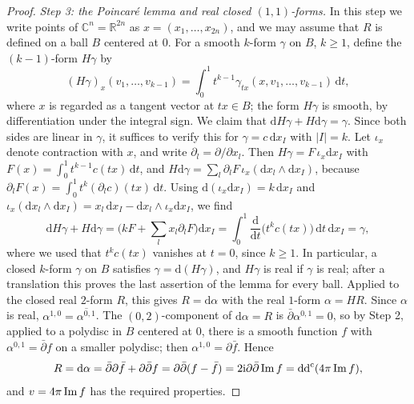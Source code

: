 \begin{proof}
\emph{Step 3: the Poincar\'e lemma and real closed $(1,1)$-forms.} In this step we write points of $\mathbb C^n=\mathbb R^{2n}$ as $x=(x_1,\ldots,x_{2n})$, and we may assume that $R$ is defined on a ball $B$ centered at $0$. For a smooth $k$-form $\gamma$ on $B$, $k\geq1$, define the $(k-1)$-form $H\gamma$ by
\[
 (H\gamma)_x(v_1,\ldots,v_{k-1})
 =\int_0^1t^{k-1}\gamma_{tx}(x,v_1,\ldots,v_{k-1})\,\mathrm{d}t,
\]
where $x$ is regarded as a tangent vector at $tx\in B$; the form $H\gamma$ is smooth, by differentiation under the integral sign. We claim that $\mathrm{d}H\gamma+H\mathrm{d}\gamma=\gamma$. Since both sides are linear in $\gamma$, it suffices to verify this for $\gamma=c\,\mathrm dx_I$ with $|I|=k$. Let $\iota_x$ denote contraction with $x$, and write $\partial_l=\partial/\partial x_l$. Then $H\gamma=F\,\iota_x\mathrm dx_I$ with $F(x)=\int_0^1t^{k-1}c(tx)\,\mathrm dt$, and $H\mathrm d\gamma=\sum_l\partial_lF\,\iota_x(\mathrm dx_l\wedge\mathrm dx_I)$, because $\partial_lF(x)=\int_0^1t^k(\partial_lc)(tx)\,\mathrm dt$. Using $\mathrm d(\iota_x\mathrm dx_I)=k\,\mathrm dx_I$ and $\iota_x(\mathrm dx_l\wedge\mathrm dx_I)=x_l\,\mathrm dx_I-\mathrm dx_l\wedge\iota_x\mathrm dx_I$, we find
\[
 \mathrm dH\gamma+H\mathrm d\gamma=\Big(kF+\sum_lx_l\partial_lF\Big)\mathrm dx_I=\int_0^1\frac{\mathrm d}{\mathrm dt}\big(t^kc(tx)\big)\,\mathrm dt\,\mathrm dx_I=\gamma,
\]
where we used that $t^kc(tx)$ vanishes at $t=0$, since $k\geq1$. In particular, a closed $k$-form $\gamma$ on $B$ satisfies $\gamma=\mathrm d(H\gamma)$, and $H\gamma$ is real if $\gamma$ is real; after a translation this proves the last assertion of the lemma for every ball. Applied to the closed real $2$-form $R$, this gives $R=\mathrm d\alpha$ with the real $1$-form $\alpha=HR$. Since $\alpha$ is real, $\alpha^{1,0}=\overline{\alpha^{0,1}}$. The $(0,2)$-component of $\mathrm d\alpha=R$ is $\bar\partial\alpha^{0,1}=0$, so by Step 2, applied to a polydisc in $B$ centered at $0$, there is a smooth function $f$ with $\alpha^{0,1}=\bar\partial f$ on a smaller polydisc; then $\alpha^{1,0}=\partial\bar f$. Hence
\[
 R=\mathrm d\alpha=\bar\partial\partial\bar f+\partial\bar\partial f=\partial\bar\partial(f-\bar f)=2\mathrm{i}\partial\bar\partial\operatorname{Im} f
   =\mathrm{dd}^{\mathrm{c}}(4\pi\operatorname{Im} f),
\]
and $v=4\pi\operatorname{Im} f$ has the required properties.
\end{proof}

